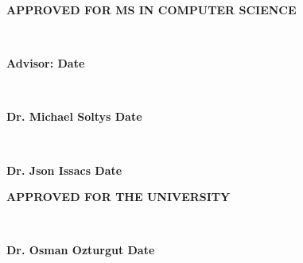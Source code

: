 \begin{center}
{\large \bfseries APPROVED FOR MS IN COMPUTER SCIENCE \par}

\vspace{1.5 cm}

\hrulefill\\
{\large \bfseries Advisor: \advisorname \hfill Date \par}

\vspace{1.5 cm}

\hrulefill\\
{\large \bfseries Dr. Michael Soltys \hfill Date \par}
\vspace{1.5 cm}

\hrulefill\\
{\large \bfseries Dr. Json Issacs \hfill Date \par}
\vspace{3 cm}

{\large \bfseries APPROVED FOR THE UNIVERSITY \par}

\vspace{1.5 cm}

\hrulefill\\
{\large \bfseries Dr. Osman Ozturgut \hfill Date \par}
\end{center}

